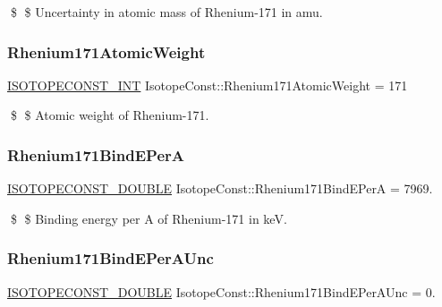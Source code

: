 \$ \$ Uncertainty in atomic mass of Rhenium-\/171 in amu. \mbox{\label{group___isotope_const-_rhenium-_re171_gade9f567b93ca24be8cfa82aee7913cd0}} 
\subsubsection{\texorpdfstring{Rhenium171\+Atomic\+Weight}{Rhenium171AtomicWeight}}
{\footnotesize\ttfamily \mbox{\hyperlink{group___isotope_const-_macros_ga5f18360b3e99483a35c32d789e62621c}{I\+S\+O\+T\+O\+P\+E\+C\+O\+N\+S\+T\+\_\+\+I\+NT}} Isotope\+Const\+::\+Rhenium171\+Atomic\+Weight = 171}

\$ \$ Atomic weight of Rhenium-\/171. \mbox{\label{group___isotope_const-_rhenium-_re171_gaa55597144c21188376ef0eebf0bdf3e1}} 
\subsubsection{\texorpdfstring{Rhenium171\+Bind\+E\+PerA}{Rhenium171BindEPerA}}
{\footnotesize\ttfamily \mbox{\hyperlink{group___isotope_const-_macros_ga8f45a7272ce02c0b4c65c44636ed719a}{I\+S\+O\+T\+O\+P\+E\+C\+O\+N\+S\+T\+\_\+\+D\+O\+U\+B\+LE}} Isotope\+Const\+::\+Rhenium171\+Bind\+E\+PerA = 7969.}

\$ \$ Binding energy per A of Rhenium-\/171 in keV. \mbox{\label{group___isotope_const-_rhenium-_re171_gad19e8c166f6342582c890fafb87d6199}} 
\subsubsection{\texorpdfstring{Rhenium171\+Bind\+E\+Per\+A\+Unc}{Rhenium171BindEPerAUnc}}
{\footnotesize\ttfamily \mbox{\hyperlink{group___isotope_const-_macros_ga8f45a7272ce02c0b4c65c44636ed719a}{I\+S\+O\+T\+O\+P\+E\+C\+O\+N\+S\+T\+\_\+\+D\+O\+U\+B\+LE}} Isotope\+Const\+::\+Rhenium171\+Bind\+E\+Per\+A\+Unc = 0.}

